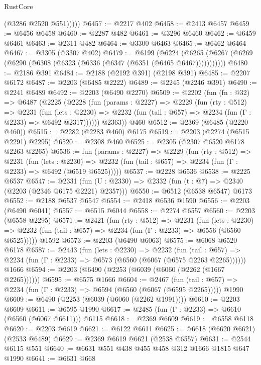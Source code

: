 \begin{lexlean}{RustCore}
\begin{coremodule}
            (@3286 @2520 @551)))))
@6457 := @2217 @402
@6458 := @2413 @6457
@6459 := @6456 @6458
@6460 := @2287 @482
@6461 := @3296 @6460
@6462 := @6459 @6461
@6463 := @2311 @482
@6464 := @3300 @6463
@6465 := @6462 @6464
@6467 := @3305 (@3307 @402)
@6479 := @6199
    (@6224 (@6265 (@6267 (@6269 (@6290 (@6308 (@6323 (@6336 (@6347 (@6351 (@6465 @6467)))))))))))
@6480 := @2186 @391
@6484 := @2188 (@2192 @391) (@2198 @391)
@6485 := @2207 @6172
@6487 := @2203 (@6485 @2222)
@6489 := @2245 (@2246 @391)
@6490 := @2241 @6489
@6492 := @2203 (@6490 @2270)
@6509 := @2202
    (fun (fn : @32) =>
    @6487
      (@2225
        (@2228
          (fun (params : @2227) =>
          @2229
            (fun (rty : @512) =>
            @2231
              (fun (lets : @2230) =>
              @2232 (fun (tail : @657) => @2234 (fun (Γ : @2233) => @6492 @2317))))))
        @2363))
    @460
@6512 := @2369 (@6485 (@2220 @460))
@6515 := @2282 (@2283 @460) @6175
@6519 := @2203 (@2274 (@6515 @2291) @2295)
@6520 := @2308 @460
@6525 := @2305 (@2307 @6520 @6178 @2263 @2265)
@6536 := fun (params : @2227) =>
  @2229
    (fun (rty : @512) =>
    @2231
      (fun (lets : @2230) =>
      @2232 (fun (tail : @657) => @2234 (fun (Γ : @2233) => @6492 (@6519 @6525)))))
@6537 := @2228 @6536
@6538 := @2225 @6537
@6547 := @2331 (fun (U : @2330) => @2332 (fun (t : @7) => @2340 (@2203 (@2346 @6175 @2221) @2357)))
@6550 := @6512 (@6538 @6547) @6173
@6552 := @2188 @6537 @6547
@6554 := @2418 @6536 @1590
@6556 := @2203 (@6490 @6041)
@6557 := @6515 @6044
@6558 := @2274 @6557
@6560 := @2203 (@6558 @2295)
@6571 := @2421
    (fun (rty : @512) =>
    @2231
      (fun (lets : @2230) =>
      @2232 (fun (tail : @657) => @2234 (fun (Γ : @2233) => @6556 (@6560 @6525)))))
    @1592
@6573 := @2203 (@6490 @6063)
@6575 := @6068 @6520 @6178
@6587 := @2443
    (fun (lets : @2230) =>
    @2232
      (fun (tail : @657) => @2234 (fun (Γ : @2233) => @6573 (@6560 (@6067 (@6575 @2263 @2265))))))
    @1666
@6594 := @2203 (@6490 (@2253 (@6039 (@6060 (@2262 (@1667 @2265))))))
@6595 := @6575 @1666
@6604 := @2467
    (fun (tail : @657) => @2234 (fun (Γ : @2233) => @6594 (@6560 (@6067 (@6595 @2265)))))
    @1990
@6609 := @6490 (@2253 (@6039 (@6060 (@2262 @1991))))
@6610 := @2203 @6609
@6611 := @6595 @1990
@6617 := @2485 (fun (Γ : @2233) => @6610 (@6560 (@6067 @6611))) @6115
@6618 := @2369 @6609
@6619 := @6558 @6118
@6620 := @2203 @6619
@6621 := @6122 @6611
@6625 := @6618 (@6620 @6621) (@2533 @6489)
@6629 := @2369 @6619 @6621 (@2538 @6557)
@6631 := @2544 @6115 @551
@6640 := @6631 @551 @438 @455 @458 @312 @1666 @1815 @647 @1990
@6641 := @6631 @668

\end{coremodule}
\end{lexlean}
